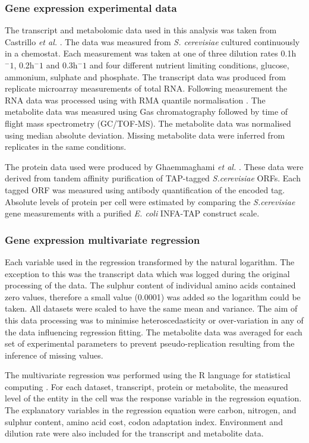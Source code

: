 \subsubsection{Gene expression experimental data}

The transcript and metabolomic data used in this analysis was taken from Castrillo \emph{et al.} \cite{castrillo2007}. The data was measured from \emph{S. cerevisiae} cultured continuously in a chemostat. Each measurement was taken at one of three dilution rates 0.1h$^-1$, 0.2h$^-1$ and 0.3h$^-1$ and four different nutrient limiting conditions, glucose, ammonium, sulphate and phosphate. The transcript data was produced from replicate microarray measurements of total RNA. Following measurement the RNA data was processed using with RMA quantile normalisation \cite{RMA}. The metabolite data was measured using Gas chromatography followed by time of flight mass spectrometry (GC/TOF-MS). The metabolite data was normalised using median absolute deviation. Missing metabolite data were inferred from replicates in the same conditions.

The protein data used were produced by Ghaemmaghami \emph{et al.} \cite{ghaemmaghami2003}. These data were derived from tandem affinity purification of TAP-tagged \emph{S.cerevisiae} ORFs. Each tagged ORF was measured using antibody quantification of the encoded tag. Absolute levels of protein per cell were estimated by comparing the \emph{S.cerevisiae} gene measurements with a purified \emph{E. coli} INFA-TAP construct scale.

\subsubsection{Gene expression multivariate regression}

Each variable used in the regression transformed by the natural logarithm. The exception to this was the transcript data which was logged during the original processing of the data. The sulphur content of individual amino acids contained zero values, therefore a small value (0.0001) was added so the logarithm could be taken. All datasets were scaled to have the same mean and variance. The aim of this data processing was to minimise heteroscedasticity or over-variation in any of the data influencing regression fitting. The metabolite data was averaged for each set of experimental parameters to prevent pseudo-replication resulting from the inference of missing values.

The multivariate regression was performed using the R language for statistical computing \cite{R}. For each dataset, transcript, protein or metabolite, the measured level of the entity in the cell was the response variable in the regression equation. The explanatory variables in the regression equation were carbon, nitrogen, and sulphur content, amino acid cost, codon adaptation index. Environment and dilution rate were also included for the transcript and metabolite data.

